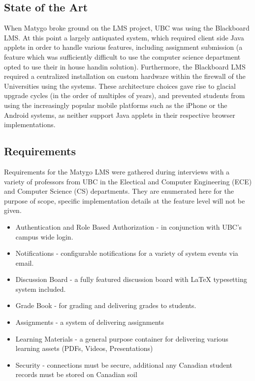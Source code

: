\documentclass[a4paper,12pt,titlepage]{report}
\begin{document}
\subsection{State of the Art} %
\label{sub:state_of_the_art}

When Matygo broke ground on the LMS project, UBC was using the Blackboard LMS. 
At this point a largely antiquated system, which required client side Java applets in order to handle various features, including assignment submission (a feature which was sufficiently difficult to use the computer science department opted to use their in house handin solution).
Furthermore, the Blackboard LMS required a centralized installation on custom hardware within the firewall of the Universities using the systems.
These architecture choices gave rise to glacial upgrade cycles (in the order of multiples of years), and prevented students from using the increasingly popular mobile platforms such as the iPhone or the Android systems, as neither support Java applets in their respective browser implementations.


\subsection{Requirements} %
\label{sub:requirements}

Requirements for the Matygo LMS were gathered during interviews with a variety of professors from UBC in the Electical and Computer Engineering (ECE) and Computer Science (CS) departments. They are enumerated here for the purpose of scope, specific implementation details at the feature level will not be given.

\begin{itemize}
	\item Authentication and Role Based Authorization - in conjunction with UBC's campus wide login. 
	\item Notifications - configurable notifications for a variety of system events via email.
	\item Discussion Board - a fully featured discussion board with LaTeX typesetting system included. 
	\item Grade Book - for grading and delivering grades to students.
	\item Assignments - a system of delivering assignments 
	\item Learning Materials - a general purpose container for delivering various learning assets (PDFs, Videos, Presentations)
	\item Security - connections must be secure, additional any Canadian student records must be stored on Canadian soil 
\end{itemize}
\end{document}
